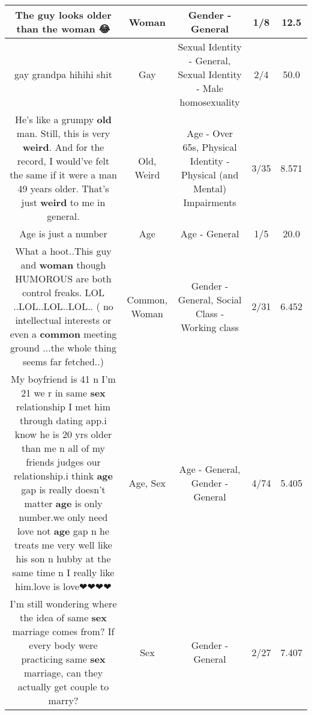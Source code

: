 \documentclass[11pt]{article}
\newlength\mylength
\begin{document}
\begin{center}
\begin{longtable}{|C{.65\mylength}|C{.30\mylength}|C{.12\mylength}|C{.12\mylength}|C{.12\mylength}|}
  \small The guy looks older than the \textbf{woman} 😂\normalsize   & Woman & Gender - General & 1/8 & 12.5 \\  \hline
  \small gay grandpa hihihi shit\normalsize   & Gay & Sexual Identity - General, Sexual Identity - Male homosexuality & 2/4 & 50.0 \\  \hline
  \small He's like a grumpy \textbf{old} man. Still, this is very \textbf{weird}. And for the record, I would've felt the same if it were a man 49 years older. That's just \textbf{weird} to me in general.\normalsize   & Old, Weird & Age - Over 65s, Physical Identity - Physical (and Mental) Impairments & 3/35 & 8.571 \\  \hline
  \small Age is just a number\normalsize   & Age & Age - General & 1/5 & 20.0 \\  \hline
  \small What a hoot..This guy and \textbf{woman} though HUMOROUS are both control freaks. LOL ..LOL..LOL..LOL.. ( no intellectual interests or even a \textbf{common} meeting ground ...the whole thing seems far fetched..)\normalsize   & Common, Woman & Gender - General, Social Class - Working class & 2/31 & 6.452 \\  \hline
  \small My boyfriend is 41 n I'm 21 we r in same \textbf{sex} relationship I met him through dating app.i know he is 20 yrs older than me n all of my friends judges our relationship.i think \textbf{age} gap is really doesn't matter \textbf{age} is only number.we only need love not \textbf{age} gap n he treats me very well like his son n hubby at the same time n I really like him.love is love❤❤❤❤\normalsize   & Age, Sex & Age - General, Gender - General & 4/74 & 5.405 \\  \hline
  \small I'm still wondering where the idea of same \textbf{sex} marriage comes from? If every body were practicing same \textbf{sex} marriage, can  they actually get couple to marry?\normalsize   & Sex & Gender - General & 2/27 & 7.407 \\  \hline

\end{longtable}
\end{center}
\end{document}
